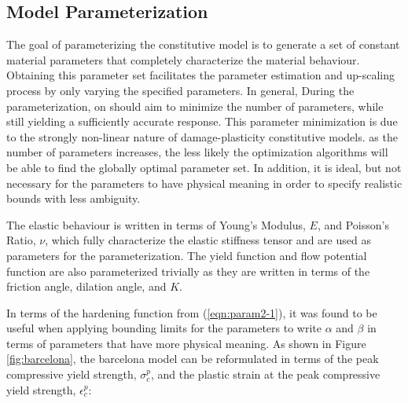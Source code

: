 \subsection{Model Parameterization}

The goal of parameterizing the constitutive model is to generate a set of constant material parameters that completely characterize the material behaviour. Obtaining this parameter set facilitates the parameter estimation and up-scaling process by only varying the specified parameters. In general, During the parameterization, on should aim to minimize the number of parameters, while still yielding a sufficiently accurate response. This parameter minimization is due to the strongly non-linear nature of damage-plasticity constitutive models. as the number of parameters increases, the less likely the optimization algorithms will be able to find the globally optimal parameter set. In addition, it is ideal, but not necessary for the parameters to have physical meaning in order to specify realistic bounds with less ambiguity.

The elastic behaviour is written in terms of Young's Modulus, $E$, and Poisson's Ratio, $\nu$, which fully characterize the elastic stiffness tensor and are used as parameters for the parameterization. The yield function and flow potential function are also parameterized trivially as they are written in terms of the friction angle, dilation angle, and $K$.

In terms of the hardening function from (\ref{eqn:param2-1}), it was found to be useful when applying bounding limits for the parameters to write $\alpha$ and $\beta$ in terms of parameters that have more physical meaning.  As shown in Figure \ref{fig:barcelona}, the barcelona model can be reformulated in terms of the peak compressive yield strength, $\sigma_{c}^{p}$, and the plastic strain at the peak compressive yield strength, $\epsilon_c^{p}$:
